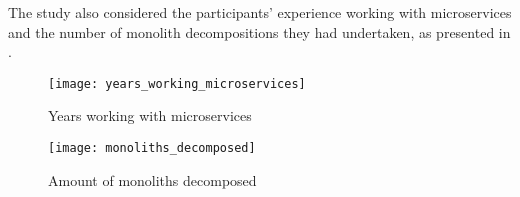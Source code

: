 The study also considered the participants' experience working with
microservices and the number of monolith decompositions they had undertaken, as
presented in .

\begin{figure*}[!htb] \caption{Years working with microservices}
  \label{fig:years_working_microservices} \centering
  \texttt{[image: years\_working\_microservices]}
\end{figure*}

\begin{figure*}[!htb] \caption{Amount of monoliths decomposed}
  \label{fig:monoliths_decomposed} \centering
  \texttt{[image: monoliths\_decomposed]}
\end{figure*}
